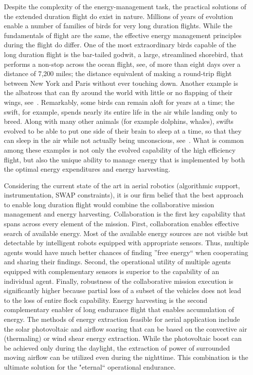 \documentclass{ifacconf}
\begin{document}
Despite the complexity of the energy-management task, the practical solutions of the extended duration flight do exist in nature. Millions of years of evolution enable a number of families of birds for very long duration flights. While the fundamentals of flight are the same, the effective energy management principles during the flight do differ. One of the most extraordinary birds capable of the long duration flight is the bar-tailed godwit, a large, streamlined shorebird, that performs a non-stop across the ocean flight, see\cite{USGS:2007}, of more than eight days over a distance of 7,200 miles; the distance equivalent of making a round-trip flight between New York and Paris without ever touching down. Another example is the albatross that can fly around the world with little or no flapping of their wings, see~\cite{Richardson:2011}. Remarkably, some birds can remain aloft for years at a time; the swift, for example, spends nearly its entire life in the air while landing only to breed. Along with many other animals (for example dolphins, whales), swifts evolved to be able to put one side of their brain to sleep at a time, so that they can sleep in the air while not actually being unconscious, see~\cite{Lapierre:2007}. What is common among these examples is not only the evolved capability of the high efficiency flight, but also the unique ability to manage energy that is implemented by both the optimal energy expenditures and energy harvesting.

Considering the current state of the art in aerial robotics (algorithmic support, instrumentation, SWAP constraints), it is our firm belief that the best approach to enable long duration flight would combine the collaborative mission management and energy harvesting. Collaboration is the first key capability that spans across every element of the mission. First, collaboration enables effective search of available energy. Most of the available energy sources are not visible but detectable by intelligent robots equipped with appropriate sensors. Thus, multiple agents would have much better chances of finding ''free energy`` when cooperating and sharing their findings. Second, the operational utility of multiple agents equipped with complementary sensors is superior to the capability of an individual agent. Finally, robustness of the collaborative mission execution is significantly higher because partial loss of a subset of the vehicles does not lead to the loss of entire flock capability. Energy harvesting is the second complementary enabler of long endurance flight that enables accumulation of energy. The methods of energy extraction feasible for aerial application include the solar photovoltaic and airflow soaring that can be based on the convective air (thermaling) or wind shear energy extraction. While the photovoltaic boost can be achieved only during the daylight, the extraction of power of surrounded moving airflow can be utilized even during the nighttime. This combination is the ultimate solution for the "eternal`` operational endurance.
\end{document}
